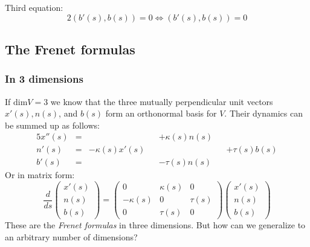 \documentclass[12pt, a4paper]{article}
\numberwithin{equation}{section}
\begin{document}
Third equation:
\begin{equation}
2(b'(s),b(s))=0\Leftrightarrow(b'(s),b(s))=0
\end{equation}

\subsection{The Frenet formulas}

\subsubsection{In 3 dimensions}
If $\textrm{dim}V=3$ we know that the three mutually perpendicular unit vectors $x'(s), n(s)$, and $b(s)$ form an orthonormal basis for $V$. Their dynamics can be summed up as follows:
\begin{alignat}{5}
x''(s) &=&				&&+\kappa(s)n(s)&& \\
n'(s)  &=& -\kappa(s)x'(s)&&				&& +\tau(s)b(s)\\
b'(s)  &=&				&&-\tau(s)n(s)	&&
\end{alignat}
Or in matrix form:
\begin{equation}
\frac{d}{ds}
\begin{pmatrix}
x'(s) \\ n(s) \\ b(s)
\end{pmatrix}=
\begin{pmatrix}
0 & \kappa(s) & 0\\
-\kappa(s) & 0 & \tau(s)\\
0 & \tau(s) & 0
\end{pmatrix}
\begin{pmatrix}
x'(s) \\ n(s) \\ b(s)
\end{pmatrix}
\end{equation}
These are the \textit{Frenet formulas} in three dimensions. But how can we generalize to an arbitrary number of dimensions?
\end{document}
